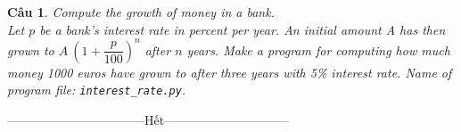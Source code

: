 \documentclass[answers]{exam}
\newtheorem{bt}{Câu}
\begin{document}
\begin{bt} Compute the growth of money in a bank. \\
	Let $p$ be a bank’s interest rate in percent per year. An initial amount A has then grown to $A \ \left(1 + \dfrac{p}{100}\right)^n$
	after $n$ years. Make a program for computing how much money 1000 euros have grown to after three years with 5\% interest rate. Name of
	program file: \verb|interest_rate.py|. 
\end{bt}

\centerline{———————————Hết——————————}


% 
   
\end{document}
